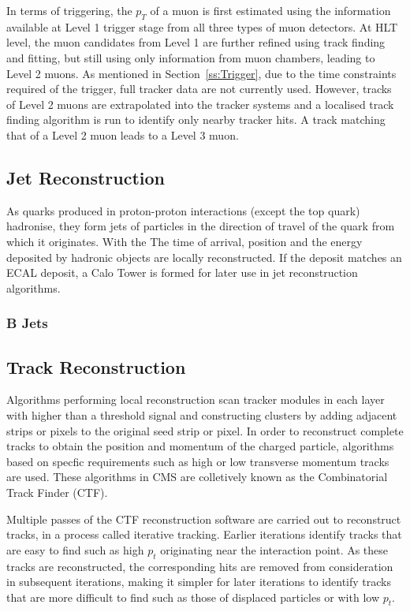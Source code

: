 In terms of triggering, the $p_{T}$ of a muon is first estimated using the information available at Level 1
trigger stage from all three types of muon detectors. At HLT level, the muon candidates from Level 1 are
further refined using track finding and fitting, but still using only information from muon chambers, leading
to Level 2 muons. As mentioned in Section~\ref{ss:Trigger}, due to the time constraints required of the
trigger, full tracker data are not currently used. However, tracks of Level 2 muons are extrapolated into the
tracker systems and a localised track finding algorithm is run to identify only nearby tracker hits. A
track matching that of a Level 2 muon leads to a Level 3 muon. %

\subsection{Jet Reconstruction}
\label{ss:jet_reconstruction}
As quarks produced in proton-proton interactions (except the top quark) hadronise, they form jets of particles
in the direction of travel of the quark from which it originates. With the 
The time of arrival, position and the energy deposited by hadronic objects are locally reconstructed. If the
deposit matches an ECAL deposit, a Calo Tower is formed for later use in jet reconstruction algorithms.

\subsubsection{B Jets}
\label{sss:b_jets}


\subsection{Track Reconstruction}
\label{ss:track_reconstruction}
Algorithms performing local reconstruction scan tracker modules in each layer with higher than a threshold
signal and constructing clusters by adding adjacent strips or pixels to the original seed strip or pixel. In
order to reconstruct complete tracks to obtain the position and momentum of the charged particle, algorithms
based on specfic requirements such as high or low transverse momentum tracks are used. These algorithms in CMS
are colletively known as the Combinatorial Track Finder (CTF).

Multiple passes of the CTF reconstruction software are carried out to reconstruct tracks, in a process called
iterative tracking. Earlier iterations identify tracks that are easy to find such as high $p_{t}$ originating
near the interaction point. As these tracks are reconstructed, the corresponding hits are removed from
consideration in subsequent iterations, making it simpler for later iterations to identify tracks that are
more difficult to find such as those of displaced particles or with low $p_{t}$.

